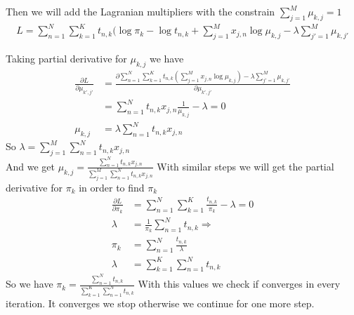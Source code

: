 Then we will add the Lagranian multipliers with the constrain $\sum_{j=1}^M \mu_{k,j} =1$
\begin{align*}
L = \sum_{n=1}^N\sum_{k=1}^K t_{n,k}(\log \pi_{k} - \log t_{n,k} + \sum_{j=1}^M x_{j,n}\log\mu_{k,j} - \lambda\sum_{j'=1}^M \mu_{k,j'}
\end{align*}

Taking partial derivative for $\mu_{k,j}$ we have
\begin{align*}
\frac{\partial L}{\partial \mu_{k',j'} } &= \frac{\partial \sum_{n=1}^N\sum_{k=1}^K t_{n,k}(\sum_{j=1}^M x_{j,n}\log\mu_{k,j}) 
- \lambda\sum_{j'=1}^M \mu_{k,j'}}{\partial \mu_{k',j'}}\\
&= \sum_{n=1}^N t_{n,k} x_{j,n} \frac{1}{\mu_{k,j}} - \lambda = 0\\
\mu_{k,j} &= \lambda \sum_{n=1}^N t_{n,k} x_{j,n}
\end{align*}
So $\lambda =\sum_{j=1}^M \sum_{n=1}^N t_{n,k} x_{j,n}$\\
And we get $\mu_{k,j} = \frac{\sum_{n=1}^N t_{n,k} x_{j,n}}{\sum_{j=1}^M \sum_{n=1}^N t_{n,k} x_{j,n}}$
With similar steps we will get the partial derivative for $\pi_k$ in order to find $\pi_k$
\begin{align*}
\frac{\partial L}{\partial \pi_k} &= \sum_{n=1}^N \sum_{k=1}^K \frac{t_{n,k}}{\pi_k} - \lambda =0\\
\lambda &= \frac{1}{\pi_k} \sum_{n=1}^N t_{n,k} \Rightarrow\\
\pi_k &= \sum_{n=1}^N\frac{t_{n,k}}{\lambda}\\
\lambda &= \sum_{k=1}^K\sum_{n=1}^N t_{n,k}
\end{align*}
So we have $\pi_k = \frac{\sum_{n=1}^N t_{n,k}}{\sum_{k=1}^K\sum_{n=1}^N t_{n,k}}$
With this values we check if converges in every iteration. It converges we stop otherwise we continue for one more step.
